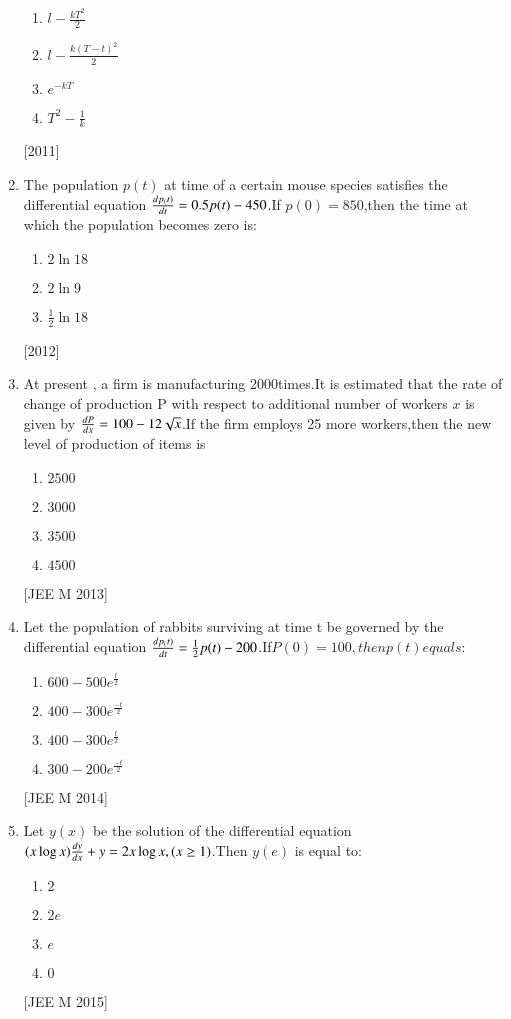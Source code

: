\documentclass[journal,12pt,twocolumn]{IEEEtran}
\theoremstyle{remark}
\begin{document}
\begin{enumerate}
\begin {enumerate}
\item $ l -\frac{kT^2}{2}$
\item $ l - \frac{k(T-t)^2}{2}$
\item $ e^{-kT}$
\item $ T^2-\frac{1}{k}$

\end{enumerate}
\hfill
{[2011]}

\item The population $p(t)$ at time of a certain mouse species satisfies the differential equation $\frac{d{p{_(t)}}}{d{t}}= 0.5p(t)- 450$.If $p(0)=850$,then the time at which the population becomes zero is:
\begin{enumerate}
    \item $ 2\ln{18}$
    \item $ 2\ln{9}$
    \item $ \frac{1}{2}\ln{18}$
\end{enumerate}
\hfill
{[2012]}

\item At present , a firm is manufacturing 2000times.It is estimated that the rate of change of production P with respect to additional number of workers $x$ is given by $\frac{d{P}}{d{x}}=100-12\sqrt{x}$.If the firm employs 25 more workers,then the new level of production of items is


\begin{enumerate}

    \item $2500$
    \item$3000$
    \item$3500$
    \item$4500$
\end{enumerate}

\hfill
{[JEE M 2013]}


\item Let the population of rabbits surviving at time t be governed by the differential equation $\frac{d{p{_(t)}}}{d{t}}=\frac{1}{2}p(t)-200$.If$P(0)=100,then p(t)equals$:
\begin{enumerate}
    \item $ 600-500e^\frac{t}{2}$
    \item $ 400-300e^\frac{-t}{2}$
    \item $ 400-300e^\frac{t}{2}$
    \item $ 300-200e^\frac{-t}{2}$
\end{enumerate}
\hfill
{[JEE M 2014]}
\item Let $y(x)$ be the solution of the differential equation $(x\log{x})\frac{d{y}}{d{x}} + y = 2x \log{x},(x\geq 1)$.Then $y(e)$ is equal to:
\begin{enumerate}
    \item $ 2 $
    \item $ 2e $
    \item $ e $
    \item $ 0 $
\end{enumerate}
\hfill
{[JEE M 2015]}


\end{enumerate}
\end{document}
